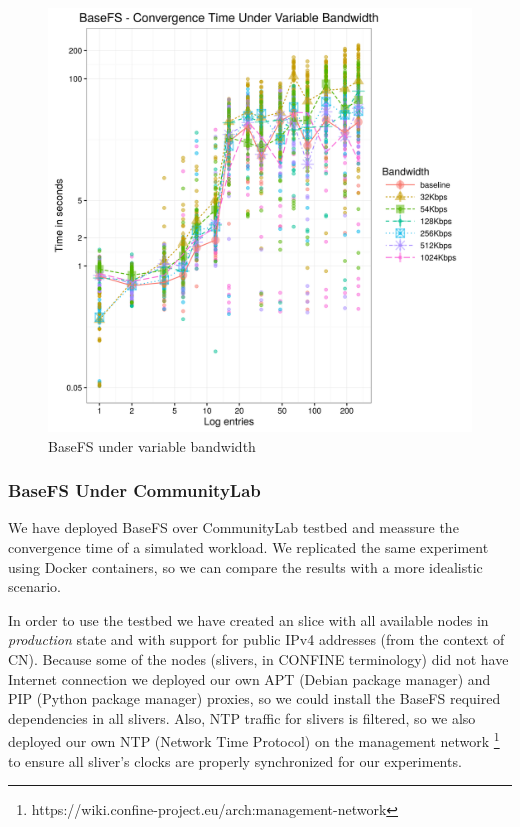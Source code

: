 \documentclass{sig-alternate}
\begin{document}
\begin{figure}[htp]
\centering
\includegraphics[width=\columnwidth]{../eval/plots/basefs-bw.png}
\caption{BaseFS under variable bandwidth}
\label{fig:basefs-bw}
\end{figure}


\subsubsection{BaseFS Under CommunityLab}

We have deployed BaseFS over CommunityLab testbed and meassure the convergence time of a simulated workload. We replicated the same experiment using Docker containers, so we can compare the results with a more idealistic scenario.

In order to use the testbed we have created an slice with all available nodes in \textit{production} state and with support for public IPv4 addresses (from the context of CN). Because some of the nodes (slivers, in CONFINE terminology) did not have Internet connection we deployed our own APT (Debian package manager) and PIP (Python package manager) proxies, so we could install the BaseFS required dependencies in all slivers. Also, NTP traffic for slivers is filtered, so we also deployed our own NTP (Network Time Protocol) on the management network \footnote{https://wiki.confine-project.eu/arch:management-network} to ensure all sliver's clocks are properly synchronized for our experiments. 
\end{document}
